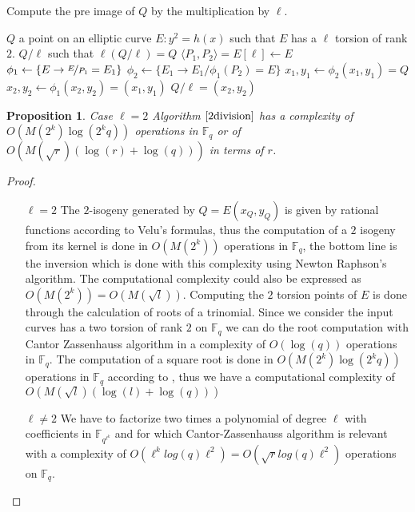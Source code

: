 \documentclass{article}
\theoremstyle{plain}
\newtheorem{prop}[thm]{Proposition}
\theoremstyle{definition}
\theoremstyle{remark}
\begin{document}
\begin{algorithm}
\caption{\label{ldivision}Compute the pre image of $Q$ by the multiplication by $\ell$.}
\begin{algorithmic}[5]
\REQUIRE $Q$ a point on an elliptic curve $E: y^2=h(x)$ such that $E$ has a $\ell$ torsion of rank $2$.
\ENSURE $Q/\ell$ such that $\ell(Q/\ell)=Q$
\STATE $ \langle P_1,P_2 \rangle = E[\ell] \gets E $
\STATE $\phi_1  \gets \lbrace E\rightarrow \nicefrac{E}{P_1}=E_1 \rbrace $
\STATE $\phi_2  \gets \lbrace E_1\rightarrow {E_1}/{\phi_1(P_2)}=E \rbrace $
\STATE $x_1,y_1 \gets \phi_2(x_1,y_1)=Q $
\STATE $x_2,y_2 \gets \phi_1(x_2,y_2)=(x_1,y_1)  $
\RETURN $Q/\ell=(x_2,y_2)$
\end{algorithmic}
\end{algorithm}

\begin{prop}{Case $\ell=2$}
Algorithm $\ref{2division}$ has a complexity of $O(M(2^k)\log(2^kq))$ operations in $\mathbb{F}_q$ or of $O(M(\sqrt{r})(\log(r)+\log(q)))$ in terms of $r$.
\end{prop}

\begin{proof}
\begin{itemize}
\item[$\ell = 2$ ]
The $2$-isogeny generated by $Q=E(x_Q,y_Q)$ is given by rational functions according to Velu's formulas, thus the computation of a $2$ isogeny from its kernel is done in $O(M(2^k))$ operations in $\mathbb{F}_q$, the bottom line is the inversion which is done with this complexity using Newton Raphson's algorithm. The computational complexity could also be expressed as $O(M(2^k))=O(M(\sqrt{l}))$.
\newline
Computing the $2$ torsion points of $E$ is done through the calculation of roots of a trinomial.
Since we consider the input curves has a two torsion of rank $2$ on $\mathbb{F}_q$ we can do the root computation with Cantor Zassenhauss algorithm in a complexity of $O( \log(q))$ operations in $\mathbb{F}_q$. 
The computation of a square root is done in $O(M(2^k)\log(2^kq))$ operations in $\mathbb{F}_q$ according to \cite{DBLP:journals/dcc/DoliskaniS15}, thus we have a computational complexity of $O(M(\sqrt{l})(\log(l)+\log(q)))$
\item[$\ell \neq 2$] We have to factorize two times a polynomial of degree $\ell$ with coefficients in $\mathbb{F}_{q^{\ell^k}}$ and for which Cantor-Zassenhauss algorithm is relevant with a complexity of $O(\ell^klog(q)\ell^2)=O(\sqrt{r}log(q)\ell^2)$ operations on $\mathbb{F}_q$.
\end{itemize}
\end{proof}
\end{document}
